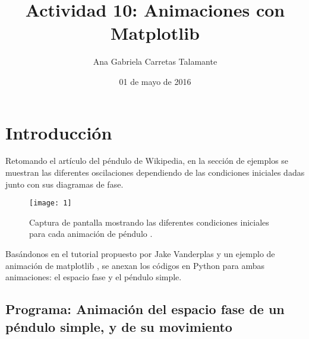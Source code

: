\documentclass[12pt]{article}
\title{Actividad 10: Animaciones con Matplotlib}
\author{Ana Gabriela Carretas Talamante}
\date{01 de mayo de 2016}
\begin{document}
\maketitle
\section{Introducción}
Retomando el artículo del péndulo de Wikipedia, en la sección de ejemplos se muestran las diferentes oscilaciones dependiendo de las condiciones iniciales dadas junto con sus diagramas de fase.

\begin{figure}[H]
\centering
 \texttt{[image: 1]}
 \caption{Captura de pantalla mostrando las diferentes condiciones iniciales para cada animación de péndulo \cite{W}.}
\end{figure}

Basándonos en el tutorial propuesto por Jake Vanderplas \cite{MAT} y un ejemplo de animación de matplotlib \cite{M}, se anexan los códigos en Python para ambas animaciones: el espacio fase y el péndulo simple.

\subsection*{Programa: Animación del espacio fase de un péndulo simple, y de su movimiento}
\end{document}
